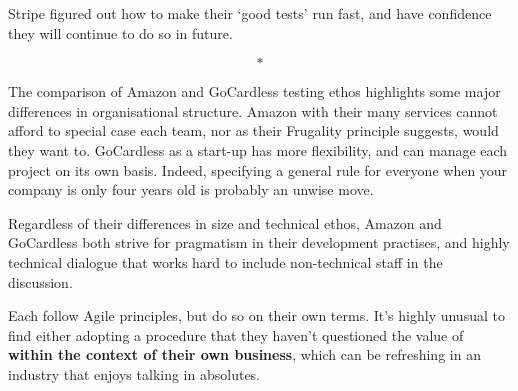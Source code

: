 \documentclass[11pt]{article}
\begin{document}
Stripe figured out how to make their `good tests' run fast, and have
confidence they will continue to do so in future.

\[*\]

The comparison of Amazon and GoCardless testing ethos highlights some major
differences in organisational structure. Amazon with their many services cannot
afford to special case each team, nor as their Frugality principle suggests,
would they want to. GoCardless as a start-up has more flexibility, and can 
manage each project on its own basis. Indeed, specifying a general rule for 
everyone when your company is only four years old is probably an unwise move.

Regardless of their differences in size and technical ethos, Amazon and
GoCardless both strive for pragmatism in their development practises, and highly 
technical dialogue that works hard to include non-technical staff in the discussion.

Each follow Agile principles, but do so on their own terms. It's highly unusual
to find either adopting a procedure that they haven't questioned the value of
\textbf{within the context of their own business}, which can be refreshing in an
industry that enjoys talking in absolutes.



\medskip
{}

\newpage
\end{document}
